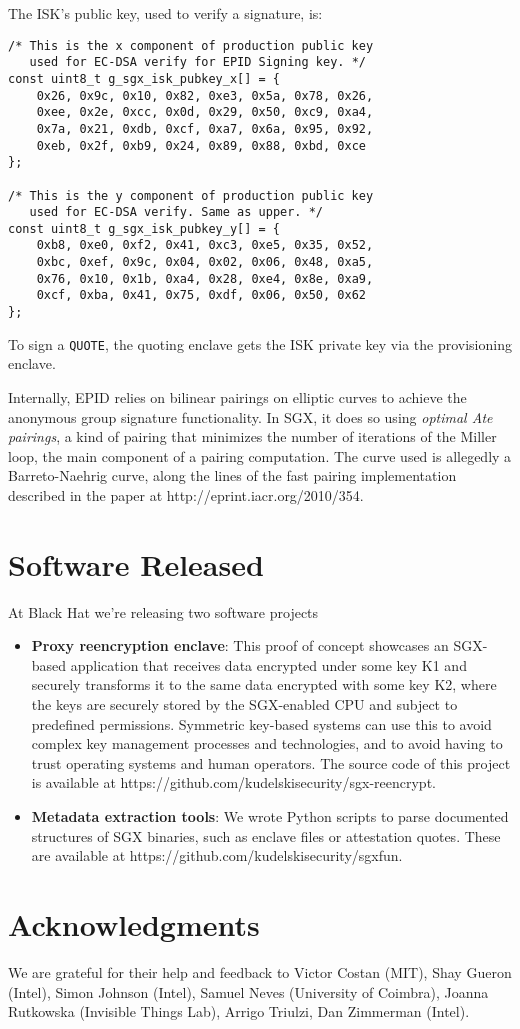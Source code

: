 \documentclass[]{article}
\begin{document}
The ISK's public key, used to verify a signature, is:

\begin{verbatim}
/* This is the x component of production public key 
   used for EC-DSA verify for EPID Signing key. */
const uint8_t g_sgx_isk_pubkey_x[] = {
    0x26, 0x9c, 0x10, 0x82, 0xe3, 0x5a, 0x78, 0x26,
    0xee, 0x2e, 0xcc, 0x0d, 0x29, 0x50, 0xc9, 0xa4,
    0x7a, 0x21, 0xdb, 0xcf, 0xa7, 0x6a, 0x95, 0x92,
    0xeb, 0x2f, 0xb9, 0x24, 0x89, 0x88, 0xbd, 0xce
};

/* This is the y component of production public key 
   used for EC-DSA verify. Same as upper. */
const uint8_t g_sgx_isk_pubkey_y[] = {
    0xb8, 0xe0, 0xf2, 0x41, 0xc3, 0xe5, 0x35, 0x52,
    0xbc, 0xef, 0x9c, 0x04, 0x02, 0x06, 0x48, 0xa5,
    0x76, 0x10, 0x1b, 0xa4, 0x28, 0xe4, 0x8e, 0xa9,
    0xcf, 0xba, 0x41, 0x75, 0xdf, 0x06, 0x50, 0x62
};
\end{verbatim}

To sign a \texttt{QUOTE}, the quoting enclave gets the ISK private key
via the provisioning enclave.

Internally, EPID relies on bilinear pairings on elliptic curves to
achieve the anonymous group signature functionality. In SGX, it does so
using \emph{optimal Ate pairings}, a kind of pairing that minimizes the
number of iterations of the Miller loop, the main component of a pairing
computation. The curve used is allegedly a Barreto-Naehrig curve, along
the lines of the fast pairing implementation described in the paper at
http://eprint.iacr.org/2010/354.

\section{Software Released}\label{software-released}

At Black Hat we're releasing two software projects

\begin{itemize}
\item
  \textbf{Proxy reencryption enclave}: This proof of concept showcases
  an SGX-based application that receives data encrypted under some key
  K1 and securely transforms it to the same data encrypted with some key
  K2, where the keys are securely stored by the SGX-enabled CPU and
  subject to predefined permissions. Symmetric key-based systems can use
  this to avoid complex key management processes and technologies, and
  to avoid having to trust operating systems and human operators. The
  source code of this project is available at
  https://github.com/kudelskisecurity/sgx-reencrypt.
\item
  \textbf{Metadata extraction tools}: We wrote Python scripts to parse
  documented structures of SGX binaries, such as enclave files or
  attestation quotes. These are available at
  https://github.com/kudelskisecurity/sgxfun.
\end{itemize}

\section{Acknowledgments}\label{acknowledgments}

We are grateful for their help and feedback to Victor Costan (MIT), Shay
Gueron (Intel), Simon Johnson (Intel), Samuel Neves (University of
Coimbra), Joanna Rutkowska (Invisible Things Lab), Arrigo Triulzi, Dan
Zimmerman (Intel).
\end{document}
